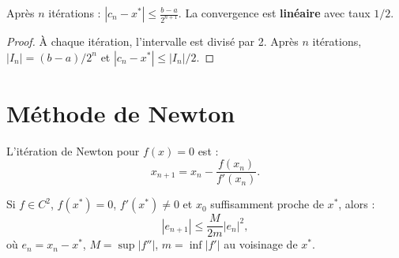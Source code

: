 \begin{theoreme}
Apr\`es $n$ it\'erations : $|c_n-x^*|\leq\frac{b-a}{2^{n+1}}$. La convergence est \textbf{lin\'eaire} avec taux $1/2$.
\end{theoreme}

\begin{proof}
\`A chaque it\'eration, l'intervalle est divis\'e par 2. Apr\`es $n$ it\'erations, $|I_n|=(b-a)/2^n$ et $|c_n-x^*|\leq|I_n|/2$.
\end{proof}

\section{M\'ethode de Newton}

\begin{definition}
L'it\'eration de Newton pour $f(x)=0$ est :
\[
x_{n+1} = x_n - \frac{f(x_n)}{f'(x_n)}.
\]
\end{definition}

\begin{center}
\end{center}

\begin{algorithm}[H]
\caption{M\'ethode de Newton}\label{alg:newton}
\end{algorithm}

\begin{theoreme}\label{thm:newton-conv}
Si $f\in C^2$, $f(x^*)=0$, $f'(x^*)\neq 0$ et $x_0$ suffisamment proche de $x^*$, alors :
\[
|e_{n+1}| \leq \frac{M}{2m}|e_n|^2,
\]
o\`u $e_n=x_n-x^*$, $M=\sup|f''|$, $m=\inf|f'|$ au voisinage de $x^*$.
\end{theoreme}

